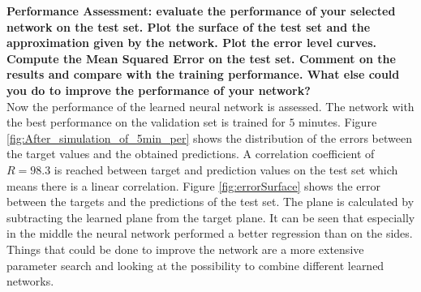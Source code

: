 \documentclass[a4paper,10pt]{article}
\begin{document}
\textbf{Performance Assessment: evaluate the performance of your selected network on the test set. Plot the surface of
	the test set and the approximation given by the network. Plot the error level curves. Compute the Mean Squared
	Error on the test set. Comment on the results and compare with the training performance. What else could you
	do to improve the performance of your network?}\\

Now the performance of the learned neural network is assessed. The network with the best performance on the validation set is trained for $ 5 $ minutes.
Figure \ref{fig:After_simulation_of_5min_per} shows the distribution of the errors between the target values and the obtained predictions. A correlation coefficient of $ R = 98.3 $ is reached between target and prediction values on the test set which means there is a linear correlation. 
Figure \ref{fig:errorSurface} shows the error between the targets and the predictions of the test set. The plane is calculated by subtracting the learned plane from the target plane. It can be seen that especially in the middle the neural network performed a better regression than on the sides. \\
Things that could be done to improve the network are a more extensive parameter search and looking at the possibility to combine different learned networks. 





\end{document}
